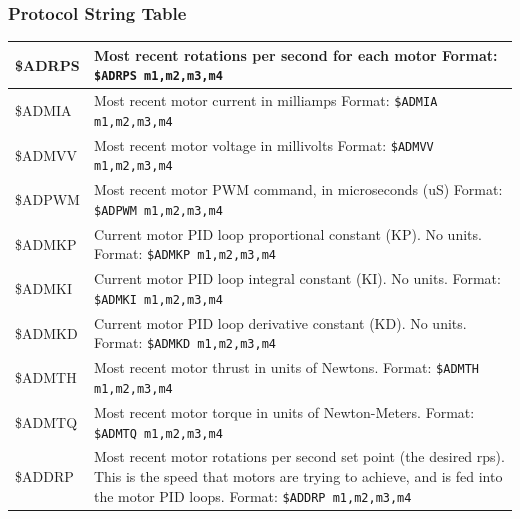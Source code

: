\documentclass{article}
\numberwithin{equation}{section} %
\begin{document}
\subsubsection{Protocol String Table}
\begin{longtable}{p{2cm}p{9cm}}
\hline
\$ADRPS &
	Most recent rotations per second for each motor \newline
	Format: \newline
	\texttt{\$ADRPS m1,m2,m3,m4} \\ 
\hline
\$ADMIA &
	Most recent motor current in milliamps \newline
	Format: \newline
	\texttt{\$ADMIA m1,m2,m3,m4} \\
\hline
\$ADMVV &
	Most recent motor voltage in millivolts \newline
	Format: \newline
	\texttt{\$ADMVV m1,m2,m3,m4} \\
\hline
\$ADPWM &
	Most recent motor PWM command, in microseconds (uS) \newline 
	Format:  \newline
	\texttt{\$ADPWM m1,m2,m3,m4} \\
\hline
\$ADMKP &
	Current motor PID loop proportional constant (KP). No units.  \newline
	Format:  \newline
	\texttt{\$ADMKP m1,m2,m3,m4} \\
\hline
\$ADMKI &
	Current motor PID loop integral constant (KI). No units.  \newline
	Format:  \newline
	\texttt{\$ADMKI m1,m2,m3,m4} \\
\hline
\$ADMKD &
	Current motor PID loop derivative constant (KD). No units.  \newline
	Format:  \newline
	\texttt{\$ADMKD m1,m2,m3,m4} \\
\hline
\$ADMTH &
	Most recent motor thrust in units of Newtons.  \newline
	Format:  \newline
	\texttt{\$ADMTH m1,m2,m3,m4} \\
\hline
\$ADMTQ &
	Most recent motor torque in units of Newton-Meters.  \newline
	Format:  \newline
	\texttt{\$ADMTQ m1,m2,m3,m4} \\
\hline
\$ADDRP &
	Most recent motor rotations per second set point (the desired rps). This is the speed that motors are trying to achieve, and is fed into the motor PID loops. 
	Format: 
	\texttt{\$ADDRP m1,m2,m3,m4} \\
\hline
\end{longtable}
\end{document}

